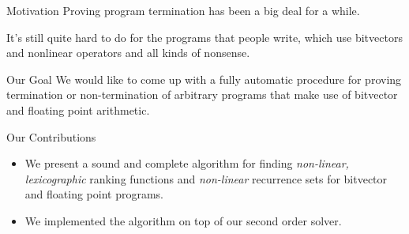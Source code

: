 \documentclass[xcolor=pdftex,t,11pt]{beamer}
\begin{document}
% 
% 


\begin{frame}{Motivation}
Proving program termination has been a big deal for a while.

\vspace{1em}

It's still quite hard to do for the programs that people write, which use bitvectors and nonlinear operators and all kinds of nonsense.

\vspace{1em}

\begin{block}{Our Goal}
 We would like to come up with a fully automatic procedure for proving termination or non-termination of
 arbitrary programs that make use of bitvector and floating point arithmetic.
\end{block}


% 
\end{frame}

\begin{frame}{Our Contributions}
 \begin{itemize}
  \item We present a sound and complete algorithm for finding \emph{non-linear, lexicographic} ranking functions
   and \emph{non-linear} recurrence sets for bitvector and floating point programs.
  \item We implemented the algorithm on top of our second order solver.
 \end{itemize}

\end{frame}
\end{document}
